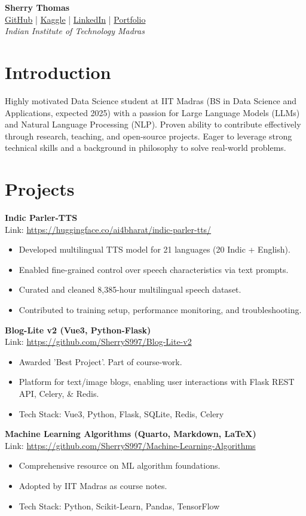 \documentclass[a4paper,10pt]{article}
\begin{document}
\pagestyle{empty}

\begin{center}
    \textbf{{\LARGE Sherry Thomas}} \\
    \href{https://github.com/SherryS997}{GitHub} | \href{https://www.kaggle.com/iveeaten3223times}{Kaggle} | \href{https://www.linkedin.com/in/sherry-thomassp/}{LinkedIn} | \href{https://sherrys997.github.io/}{Portfolio} \\
    \textit{Indian Institute of Technology Madras}
\end{center}

\section*{Introduction}
Highly motivated Data Science student at IIT Madras (BS in Data Science and Applications, expected 2025) with a passion for Large Language Models (LLMs) and Natural Language Processing (NLP). Proven ability to contribute effectively through research, teaching, and open-source projects. Eager to leverage strong technical skills and a background in philosophy to solve real-world problems.

\section*{Projects}
\textbf{Indic Parler-TTS} \\
Link: \url{https://huggingface.co/ai4bharat/indic-parler-tts/}  
\begin{itemize}[noitemsep]
    \item Developed multilingual TTS model for 21 languages (20 Indic + English).
    \item Enabled fine-grained control over speech characteristics via text prompts.
    \item Curated and cleaned 8,385-hour multilingual speech dataset.
    \item Contributed to training setup, performance monitoring, and troubleshooting.
\end{itemize}
\textbf{Blog-Lite v2 (Vue3, Python-Flask)} \\
Link: \url{https://github.com/SherryS997/Blog-Lite-v2}  
\begin{itemize}[noitemsep]
    \item Awarded 'Best Project'. Part of course-work.
    \item Platform for text/image blogs, enabling user interactions with Flask REST API, Celery, & Redis.
    \item Tech Stack: Vue3, Python, Flask, SQLite, Redis, Celery
\end{itemize}
\textbf{Machine Learning Algorithms (Quarto, Markdown, LaTeX)} \\
Link: \url{https://github.com/SherryS997/Machine-Learning-Algorithms}  
\begin{itemize}[noitemsep]
    \item Comprehensive resource on ML algorithm foundations.
    \item Adopted by IIT Madras as course notes.
    \item Tech Stack: Python, Scikit-Learn, Pandas, TensorFlow
\end{itemize}
\end{document}
